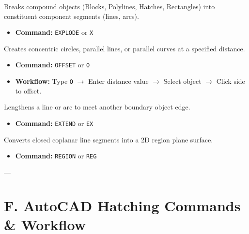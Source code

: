 \begin{autocadcmd}[EXPLODE]
Breaks compound objects (Blocks, Polylines, Hatches, Rectangles) into constituent component segments (lines, arcs).
\begin{itemize}
    \item \textbf{Command:} \texttt{EXPLODE} or \texttt{X}
\end{itemize}
\end{autocadcmd}

\begin{autocadcmd}[OFFSET]
Creates concentric circles, parallel lines, or parallel curves at a specified distance.
\begin{itemize}
    \item \textbf{Command:} \texttt{OFFSET} or \texttt{O}
    \item \textbf{Workflow:} Type \texttt{O} $\to$ Enter distance value $\to$ Select object $\to$ Click side to offset.
\end{itemize}
\end{autocadcmd}

\begin{autocadcmd}[EXTEND]
Lengthens a line or arc to meet another boundary object edge.
\begin{itemize}
    \item \textbf{Command:} \texttt{EXTEND} or \texttt{EX}
\end{itemize}
\end{autocadcmd}

\begin{autocadcmd}[REGION]
Converts closed coplanar line segments into a 2D region plane surface.
\begin{itemize}
    \item \textbf{Command:} \texttt{REGION} or \texttt{REG}
\end{itemize}
\end{autocadcmd}

---

\section{F. AutoCAD Hatching Commands \& Workflow}

